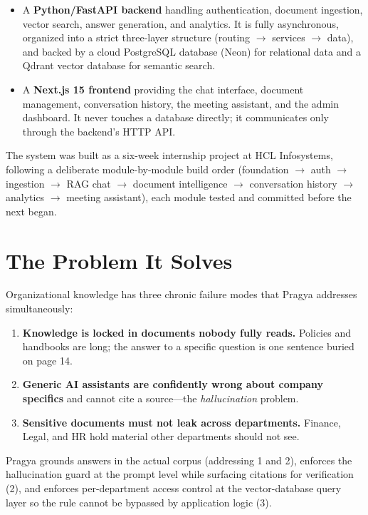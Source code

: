 \documentclass[11pt,a4paper,oneside]{report}
\begin{document}
\begin{itemize}
  \item A \textbf{Python/FastAPI backend} handling authentication, document ingestion, vector
  search, answer generation, and analytics. It is fully asynchronous, organized into a strict
  three-layer structure (routing $\rightarrow$ services $\rightarrow$ data), and backed by a
  cloud PostgreSQL database (Neon) for relational data and a Qdrant vector database for
  semantic search.
  \item A \textbf{Next.js 15 frontend} providing the chat interface, document management,
  conversation history, the meeting assistant, and the admin dashboard. It never touches a
  database directly; it communicates only through the backend's HTTP API.
\end{itemize}

The system was built as a six-week internship project at HCL Infosystems, following a
deliberate module-by-module build order (foundation $\rightarrow$ auth $\rightarrow$ ingestion
$\rightarrow$ RAG chat $\rightarrow$ document intelligence $\rightarrow$ conversation history
$\rightarrow$ analytics $\rightarrow$ meeting assistant), each module tested and committed
before the next began.

\section{The Problem It Solves}
Organizational knowledge has three chronic failure modes that Pragya addresses simultaneously:

\begin{enumerate}
  \item \textbf{Knowledge is locked in documents nobody fully reads.} Policies and handbooks
  are long; the answer to a specific question is one sentence buried on page 14.
  \item \textbf{Generic AI assistants are confidently wrong about company specifics} and cannot
  cite a source---the \emph{hallucination} problem.
  \item \textbf{Sensitive documents must not leak across departments.} Finance, Legal, and HR
  hold material other departments should not see.
\end{enumerate}

Pragya grounds answers in the actual corpus (addressing 1 and 2), enforces the hallucination
guard at the prompt level while surfacing citations for verification (2), and enforces
per-department access control at the vector-database query layer so the rule cannot be bypassed
by application logic (3).
\end{document}
